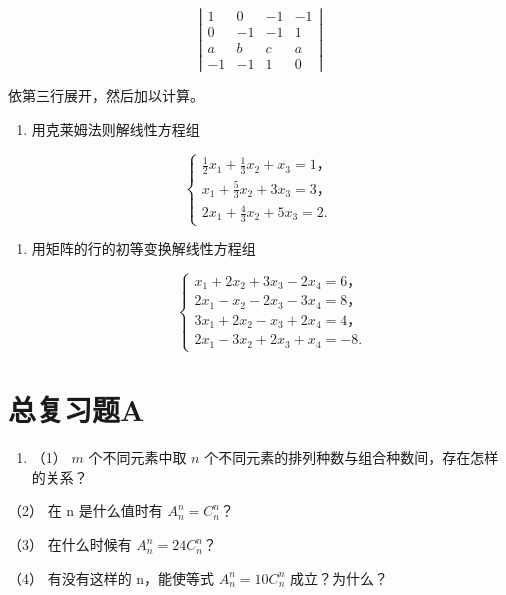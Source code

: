 \[
\left| \begin{array}{cccc} 1 & 0 & - 1 & - 1 \\ 0 & - 1 & - 1 & 1 \\ a & b & c & a \\ - 1 & - 1 & 1 & 0 \end{array} \right|
\]

依第三行展开，然后加以计算。

\begin{enumerate}[start=6]
\item
  用克莱姆法则解线性方程组
\end{enumerate}

\[
\left\{ \begin{array}{l} \frac {1}{2} x _ {1} + \frac {1}{3} x _ {2} + x _ {3} = 1\text{，} \\ x _ {1} + \frac {5}{3} x _ {2} + 3 x _ {3} = 3\text{，} \\ 2 x _ {1} + \frac {4}{3} x _ {2} + 5 x _ {3} = 2. \end{array} \right.
\]

\begin{enumerate}[start=7,label={*\arabic*.}]
\item
  用矩阵的行的初等变换解线性方程组

\[
\left\{ \begin{array}{l} x _ {1} + 2 x _ {2} + 3 x _ {3} - 2 x _ {4} = 6\text{，} \\ 2 x _ {1} - x _ {2} - 2 x _ {3} - 3 x _ {4} = 8\text{，} \\ 3 x _ {1} + 2 x _ {2} - x _ {3} + 2 x _ {4} = 4\text{，} \\ 2 x _ {1} - 3 x _ {2} + 2 x _ {3} + x _ {4} = - 8. \end{array} \right.
\]

\end{enumerate}
\section{总复习题A}

\begin{enumerate}
\item
  （1） \(m\) 个不同元素中取 \(n\)
  个不同元素的排列种数与组合种数间，存在怎样的关系？
\end{enumerate}

（2） 在 n 是什么值时有 \(A_{n}^{n}=C_{n}^{n}\)？

（3） 在什么时候有 \(A_{n}^{n}=24C_{n}^{n}\)？

（4） 有没有这样的 n，能使等式 \(A_{n}^{n}=10C_{n}^{n}\) 成立？为什么？

